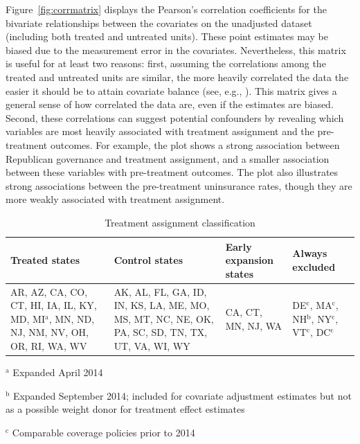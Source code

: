Figure~\ref{fig:corrmatrix} displays the Pearson's correlation coefficients for the bivariate relationships between the covariates on the unadjusted dataset (including both treated and untreated units). These point estimates may be biased due to the measurement error in the covariates. Nevertheless, this matrix is useful for at least two reasons: first, assuming the correlations among the treated and untreated units are similar, the more heavily correlated the data the easier it should be to attain covariate balance (see, e.g., \cite{d2021overlap}). This matrix gives a general sense of how correlated the data are, even if the estimates are biased. Second, these correlations can suggest potential confounders by revealing which variables are most heavily associated with treatment assignment and the pre-treatment outcomes. For example, the plot shows a strong association between Republican governance and treatment assignment, and a smaller association between these variables with pre-treatment outcomes. The plot also illustrates strong associations between the pre-treatment uninsurance rates, though they are more weakly associated with treatment assignment. 

\begin{table}[h!]\caption{Treatment assignment classification}\label{tab:txassign}
\centering
\hline 
\begin{tabularx}{\textwidth}{XXXX} \\ 
Treated states & Control states & Early expansion states & Always excluded \\ 
\hline
AR, AZ, CA, CO, CT, HI, IA, IL, KY, MD, MI$^\textrm{a}$, MN, ND, NJ, NM, NV, OH, OR, RI, WA, WV & AK, AL, FL, GA, ID, IN, KS, LA, ME, MO, MS, MT, NC, NE, OK, PA, SC, SD, TN, TX, UT, VA, WI, WY & CA, CT, MN, NJ, WA & DE$^\textrm{c}$, MA$^\textrm{c}$, NH$^\textrm{b}$, NY$^\textrm{c}$, VT$^\textrm{c}$, DC$^\textrm{c}$\\ 
\hline 
\end{tabularx} {
     \vspace{1ex} }
     {\par \raggedright $^\textrm{a}$ Expanded April 2014 \par 
     \raggedright $^\textrm{b}$ Expanded September 2014; included for covariate adjustment estimates but not as a possible weight donor for treatment effect estimates \par 
    \raggedright $^\textrm{c}$ Comparable coverage policies prior to 2014 
    \par}
\end{table}


